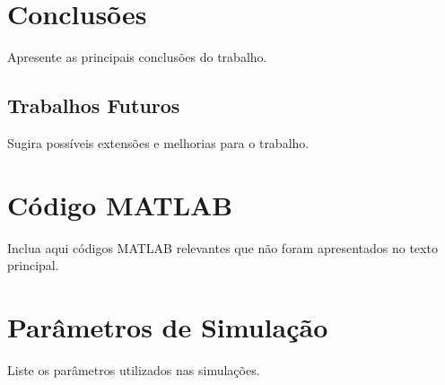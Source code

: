 \documentclass[12pt, a4paper]{article}
\begin{document}
\section{Conclusões}

Apresente as principais conclusões do trabalho.

\subsection{Trabalhos Futuros}

Sugira possíveis extensões e melhorias para o trabalho.




\appendix

\section{Código MATLAB}

Inclua aqui códigos MATLAB relevantes que não foram apresentados no texto principal.

\section{Parâmetros de Simulação}

Liste os parâmetros utilizados nas simulações.
\end{document}
